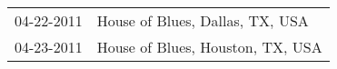 \begin{supertabular}{ll}
 04-22-2011 &   House of Blues, Dallas, TX, USA \\
 04-23-2011 &  House of Blues, Houston, TX, USA \\
\end{supertabular}
